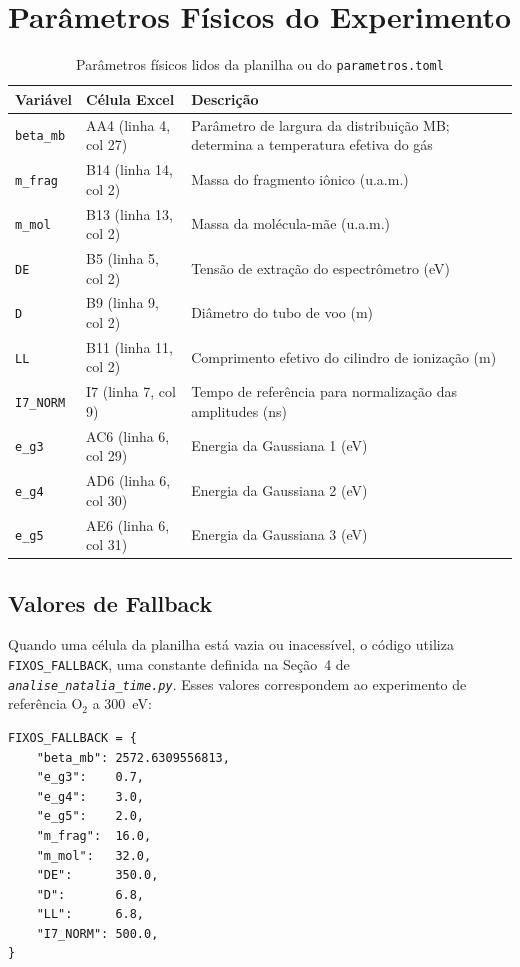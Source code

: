 \documentclass[12pt,a4paper]{report}
\newcommand{\code}[1]{\texttt{#1}}
\newcommand{\arquivo}[1]{\texttt{\itshape #1}}
\begin{document}
\section{Parâmetros Físicos do Experimento}

\begin{table}[h!]
  \centering
  \caption{Parâmetros físicos lidos da planilha ou do \texttt{parametros.toml}}
  \begin{tabular}{llp{7cm}}
    \toprule
    \textbf{Variável} & \textbf{Célula Excel} & \textbf{Descrição} \\
    \midrule
    \code{beta\_mb} & AA4 (linha 4, col 27) & Parâmetro de largura da distribuição MB; determina a temperatura efetiva do gás \\
    \code{m\_frag}  & B14 (linha 14, col 2) & Massa do fragmento iônico (u.a.m.) \\
    \code{m\_mol}   & B13 (linha 13, col 2) & Massa da molécula-mãe (u.a.m.) \\
    \code{DE}       & B5  (linha 5, col 2)  & Tensão de extração do espectrômetro (eV) \\
    \code{D}        & B9  (linha 9, col 2)  & Diâmetro do tubo de voo (m) \\
    \code{LL}       & B11 (linha 11, col 2) & Comprimento efetivo do cilindro de ionização (m) \\
    \code{I7\_NORM} & I7  (linha 7, col 9)  & Tempo de referência para normalização das amplitudes (ns) \\
    \code{e\_g3}    & AC6 (linha 6, col 29) & Energia da Gaussiana 1 (eV) \\
    \code{e\_g4}    & AD6 (linha 6, col 30) & Energia da Gaussiana 2 (eV) \\
    \code{e\_g5}    & AE6 (linha 6, col 31) & Energia da Gaussiana 3 (eV) \\
    \bottomrule
  \end{tabular}
\end{table}

\subsection{Valores de Fallback}

Quando uma célula da planilha está vazia ou inacessível, o código utiliza
\code{FIXOS\_FALLBACK}, uma constante definida na Seção~4 de
\arquivo{analise\_natalia\_time.py}. Esses valores correspondem ao experimento
de referência O$_2$ a 300~eV:

\begin{lstlisting}[caption={Dicionário FIXOS\_FALLBACK}]
FIXOS_FALLBACK = {
    "beta_mb": 2572.6309556813,
    "e_g3":    0.7,
    "e_g4":    3.0,
    "e_g5":    2.0,
    "m_frag":  16.0,
    "m_mol":   32.0,
    "DE":      350.0,
    "D":       6.8,
    "LL":      6.8,
    "I7_NORM": 500.0,
}
\end{lstlisting}
\end{document}
